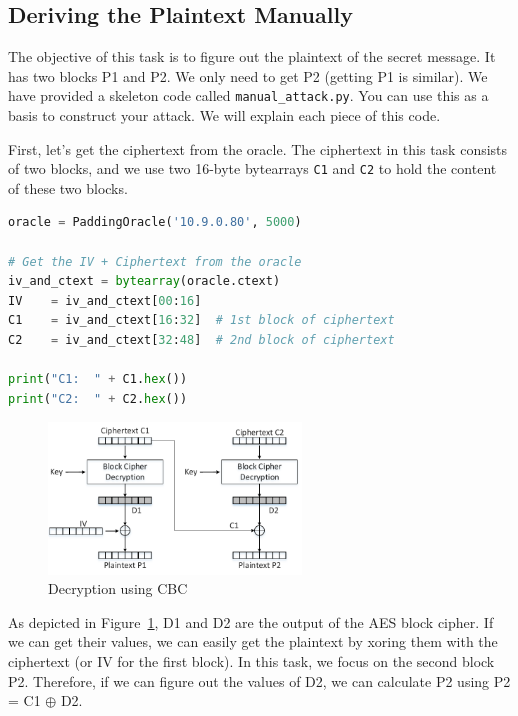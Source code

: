 \subsection{Deriving the Plaintext Manually} 


The objective of this task is to figure out the plaintext 
of the secret message. It has two blocks P1 and P2. 
We only need to get P2 (getting P1 is similar). 
We have provided a skeleton code called \texttt{manual\_attack.py}. 
You can use this as a basis to construct your attack. We 
will explain each piece of this code. 


First, let's get the ciphertext from the oracle. 
The ciphertext in this task consists of two blocks, and 
we use two 16-byte bytearrays \texttt{C1} and \texttt{C2}
to hold the content of these two blocks.

\begin{lstlisting}[language=python]
oracle = PaddingOracle('10.9.0.80', 5000)

# Get the IV + Ciphertext from the oracle
iv_and_ctext = bytearray(oracle.ctext)
IV    = iv_and_ctext[00:16]
C1    = iv_and_ctext[16:32]  # 1st block of ciphertext
C2    = iv_and_ctext[32:48]  # 2nd block of ciphertext

print("C1:  " + C1.hex())
print("C2:  " + C2.hex())
\end{lstlisting}


\begin{figure}[htb]
  \begin{center}
    \includegraphics[width=0.6\textwidth]{Figs/cbc-dec.pdf}
  \end{center}
  \caption{Decryption using CBC}
  \label{fig:cbc-dec}
\end{figure}
 
 
As depicted in Figure~\ref{fig:cbc-dec}, D1 and D2 are the 
output of the AES block cipher. If we can 
get their values, we can easily get the plaintext
by xoring them with the ciphertext (or IV for the first block). 
In this task, we focus on the second block P2. Therefore, if we can
figure out the values of D2, 
we can calculate P2 using P2 = C1 $\oplus$ D2.


